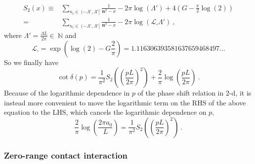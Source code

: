\begin{align}
S_2(x)\equiv&\sum_{n_i\in\ (-\Lambda',\Lambda']}\frac { 1 } { \bm{n}^2 -x}-2\pi\log\left(\Lambda'\right)+4\left(G-\frac{\pi }{2}\log(2)\right)\\
=&\sum_{n_i\in\ (-\Lambda',\Lambda']}\frac { 1 } { \bm{n}^2 -x}-2\pi\log\left(\mathcal{L}_\square\Lambda'\right)\ ,
\end{align}
where $\Lambda'=\frac{\Lambda L}{2\pi} \in\ \mathbb{N}$ and
\begin{equation}
\mathcal{L}_\square=\exp\left(\log(2)-G\frac{2}{\pi}\right)=1.116306393581637659468497\ldots
\end{equation}
So we finally have
\begin{equation}\label{eqn:S2}
\cot\delta(p)=\frac{1}{\pi^2}S_2\left(\left(\frac{p L}{2\pi}\right)^2\right)+\frac{2}{\pi}\log\left(\frac{pL}{2\pi}\right)\ .
\end{equation}
Because of the logarithmic dependence in $p$ of the phase shift relation in 2-d, it is instead more convenient to move the logarithmic term on the RHS of the above equation to the LHS, which cancels the logarithmic dependence on $p$,
\begin{equation}
\frac{2}{\pi}\log\left(\frac{2\pi a_0 }{L}\right)=\frac{1}{\pi^2}S_2\left(\left(\frac{p L}{2\pi}\right)^2\right)\ .
\end{equation}

\subsubsection{Zero-range contact interaction}

